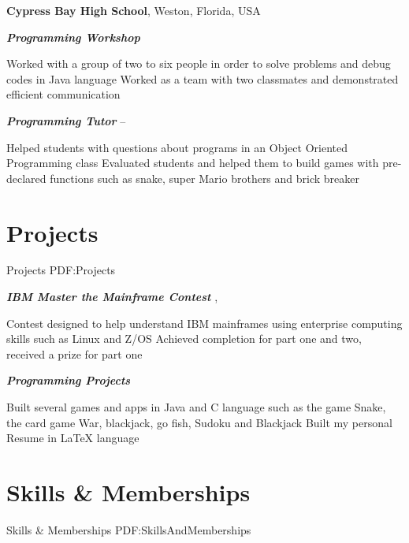 \documentclass[letterpaper,MMMyyyy,nonstop]{simpleresumecv}
\begin{document}
\begin{body}
\begin{detail}
\end{detail}

\BigGap
\textbf{Cypress Bay High School},
Weston, Florida, USA

\Gap
\BulletItem
\textbf{\textit{Programming Workshop}}
\hfill
{} 
\begin{detail}
\SubBulletItem
\small Worked with a group of two to six people in order to solve problems and debug codes in Java language
\SubBulletItem 
Worked as a team with two classmates and demonstrated efficient communication
\end{detail}

\Gap
\BulletItem
\textbf{\textit{Programming Tutor}}
\hfill
{} --
\begin{detail}
\SubBulletItem
Helped students with questions about programs in an Object Oriented Programming class
\SubBulletItem 
Evaluated students and helped them to build games with pre-declared functions such as snake, super Mario brothers and brick breaker
\end{detail}




\section
{Projects}
{Projects}
{PDF:Projects}

\Gap
\BulletItem
\textbf{\textit{IBM Master the Mainframe Contest}}
\hfill
{}, 
\begin{detail}
\SubBulletItem
\small
Contest designed to help understand IBM mainframes using enterprise computing skills such
as Linux and Z/OS
\SubBulletItem 
Achieved completion for part one and two, received a prize for part one
\end{detail}

\Gap
\BulletItem
\textbf{\textit{Programming Projects}}
\hfill
\begin{detail}
\SubBulletItem
\small
Built several games and apps in Java and C language such as the game Snake, the card game War, blackjack, go fish, Sudoku and Blackjack
\SubBulletItem 
Built my personal Resume in LaTeX language
\end{detail}


\section
{Skills \&\newline
Memberships}
{Skills \& Memberships}
{PDF:SkillsAndMemberships}


\end{body}
\end{document}
